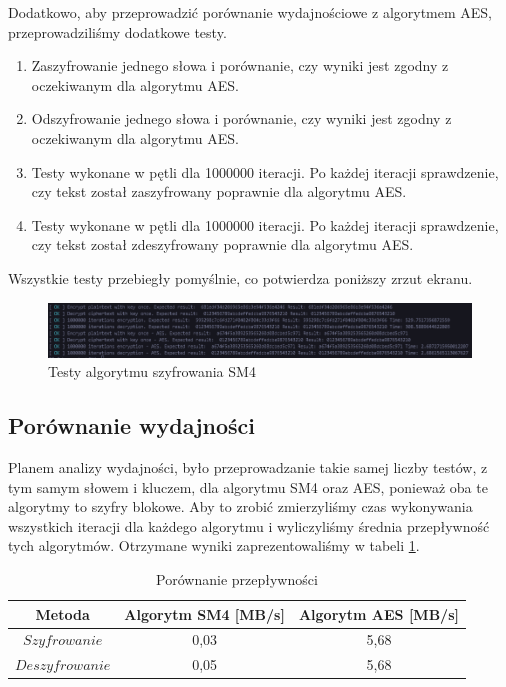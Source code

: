 Dodatkowo, aby przeprowadzić porównanie wydajnościowe z algorytmem AES, przeprowadziliśmy dodatkowe testy.\\
\begin{enumerate}
    \item Zaszyfrowanie jednego słowa i porównanie, czy wyniki jest zgodny z oczekiwanym dla algorytmu AES.\\
    \item Odszyfrowanie jednego słowa i porównanie, czy wyniki jest zgodny z oczekiwanym dla algorytmu AES.\\
    \item Testy wykonane w pętli dla 1000000 iteracji. Po każdej iteracji sprawdzenie, czy tekst został zaszyfrowany poprawnie dla algorytmu AES.\\
    \item Testy wykonane w pętli dla 1000000 iteracji. Po każdej iteracji sprawdzenie, czy tekst został zdeszyfrowany poprawnie dla algorytmu AES.\\
\end{enumerate}



Wszystkie testy przebiegły pomyślnie, co potwierdza poniższy zrzut ekranu.

\begin{figure}[H]
  \centering
  \includegraphics[scale=0.7]{diagramy/testy.PNG}
  \caption{Testy algorytmu szyfrowania SM4}
  \label{fig:SM4}
\end{figure}

\subsection{ Porównanie wydajności }

Planem analizy wydajności, było przeprowadzanie takie samej liczby testów, z tym samym słowem i kluczem, dla algorytmu SM4 oraz AES, ponieważ oba te algorytmy to szyfry blokowe. Aby to zrobić zmierzyliśmy czas wykonywania wszystkich iteracji dla każdego algorytmu i wyliczyliśmy średnia przepływność tych algorytmów. Otrzymane wyniki zaprezentowaliśmy w tabeli  \ref{table:AES_to_SM4}.

\begin{table}[h!]
\centering
\caption{Porównanie przepływności}
\label{table:AES_to_SM4}
\begin{tabular}{ | c | c | c | } 
\hline
 Metoda & Algorytm SM4 [MB/s]& Algorytm AES [MB/s] \\
\hline
$Szyfrowanie$ & 0,03 & 5,68 \\
$Deszyfrowanie$ & 0,05 & 5,68\\
\hline
\end{tabular}
\end{table}

